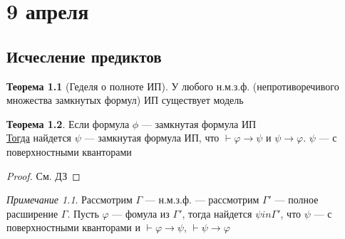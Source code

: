 \documentclass[oneside]{book}
\theoremstyle{plain}
\theoremstyle{remark}
\newtheorem*{remark}{Примечание}
\theoremstyle{definition}
\newtheorem{theorem}{Теорема}[section]
\begin{document}
\chapter{9 апреля}
\label{sec:orgf020e16}
\section{Исчесление предиктов}
\label{sec:org9aa0b92}
\begin{theorem}[Геделя о полноте ИП]
У любого н.м.з.ф. (непротиворечивого множества замкнутых формул) ИП существует модель
\end{theorem}
\begin{theorem}
Если формула \(\phi\) --- замкнутая формула ИП \\
\uline{Тогда} найдется \(\psi\) --- замкнутая формула ИП, что \(\vdash \varphi \to \psi\) и \(\psi \to \varphi\). \(\psi\) --- с поверхностными кванторами
\end{theorem}
\begin{proof}
См. ДЗ
\end{proof}
\begin{remark}
Рассмотрим \(\Gamma\) --- н.м.з.ф. --- рассмотрим \(\Gamma'\) --- полное расширение \(\Gamma\). Пусть \(\varphi\) --- фомула из \(\Gamma'\), тогда найдется \(\psi in \Gamma'\), что \(\psi\) --- с поверхностными кванторами и \(\vdash \varphi \to \psi\), \(\vdash \psi \to \varphi\)
\end{remark}
\end{document}
